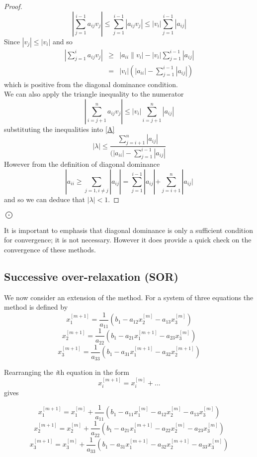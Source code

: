 \begin{proof}
\[ \left|\sum_{j=1}^{i-1}a_{ij}v_j \right| \leq \sum_{j=1}^{i-1}|a_{ij}v_j| \leq |v_i|\sum_{j=1}^{i-1}|a_{ij}|  \]
Since $|v_j| \leq |v_i|$ and so
\begin{eqnarray*} 
\left|\sum_{j=1}^{i}a_{ij}v_j \right| & \geq & |a_{ii}\lVert v_{i}| -|v_i|\sum_{j=1}^{i-1}|a_{ij}|  \\
 & = & |v_i|(|a_{ii}| -\sum_{j=1}^{i-1}|a_{ij}|)  
\end{eqnarray*} 
which is positive from the diagonal dominance condition.\\
We can also apply the triangle inequality to the numerator
\[\left|\sum_{i=j+1}^{n}a_{ij}v_j\right| \leq |v_i| \sum_{i=j+1}^{n}|a_{ij}| \]
substituting the inequalities into \ref{A}
\[ |\lambda| \leq \frac{\sum_{j=i+1}^{n}|a_{ij}|}{(|a_{ii}| -\sum_{j=1}^{i-1}|a_{ij}|} \]
However from the definition of diagonal dominance
\[|a_{ii} \geq \sum_{j=1,i\not=j}|a_{ij}|=\sum_{j=1}^{i-1}|a_{ij}|+\sum_{j=i+1}^{n}|a_{ij}| \]
and so we can deduce that $|\lambda| < 1$.
\end{proof}$\bigodot$

It is important  to emphasis that diagonal dominance is only a sufficient
condition for convergence; it is not necessary.  However it does provide a quick check on the convergence of these methods.
\subsection{Successive over-relaxation (SOR)}

We now consider an extension of the  method. For a system of 
three equations the  method is defined by
\begin{equation*}
x_{1}^{[m+1]} = \frac{1}{a_{11}}(b_1-a_{12}x_2^{[m]} - a_{13}x^{[m]}_{3}) 
\end{equation*}
\begin{equation*}
x_{2}^{[m+1]} = \frac{1}{a_{22}}(b_1-a_{21}x_1^{[m+1]} - a_{23}x^{[m]}_{3}) 
\end{equation*}
\begin{equation*}
x_{3}^{[m+1]} = \frac{1}{a_{33}}(b_1-a_{31}x_1^{[m+1]} - a_{32}x^{[m+1]}_{2})
\end{equation*}

Rearranging the \emph{i}th equation in the form
\[ x_{i}^{[m+1]} = x_{i}^{[m]} + . .. \]
gives 

\begin{equation*}
x_{1}^{[m+1]} =x_1^{[m]}+ \frac{1}{a_{11}}(b_1-a_{11}x_{1}^{[m]}-a_{12}x_2^{[m]} - a_{13}x^{[m]}_{3}) 
\end{equation*}
\begin{equation*}
x_{2}^{[m+1]} =x_2^{[m]}+ \frac{1}{a_{22}}(b_1-a_{21}x_1^{[m+1]}-a_{22}x_{2}^{[m]} - a_{23}x^{[m]}_{3}) 
\end{equation*}
\begin{equation*}
x_{3}^{[m+1]} =x_3^{[m]}+ \frac{1}{a_{33}}(b_1-a_{31}x_1^{[m+1]} - a_{32}x^{[m+1]}_{2}-a_{33}x_{3}^{[m]})
\end{equation*}

